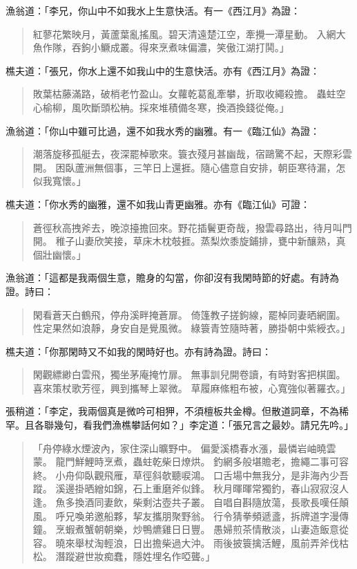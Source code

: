 漁翁道：「李兄，你山中不如我水上生意快活。有一《西江月》為證：
\begin{quote}
紅蓼花繁映月，黃蘆葉亂搖風。碧天清遠楚江空，牽攪一潭星動。
入網大魚作隊，吞鉤小鱖成叢。得來烹煮味偏濃，笑傲江湖打鬨。」
\end{quote}

樵夫道：「張兄，你水上還不如我山中的生意快活。亦有《西江月》為證：
\begin{quote}
敗葉枯藤滿路，破梢老竹盈山。女蘿乾葛亂牽攀，折取收繩殺擔。
蟲蛀空心榆柳，風吹斷頭松柟。採來堆積備冬寒，換酒換錢從俺。」
\end{quote}

漁翁道：「你山中雖可比過，還不如我水秀的幽雅。有一《臨江仙》為證：
\begin{quote}
潮落旋移孤艇去，夜深罷棹歌來。簑衣殘月甚幽哉，宿鷗驚不起，天際彩雲開。
困臥蘆洲無個事，三竿日上還捱。隨心儘意自安排，朝臣寒待漏，怎似我寬懷。」
\end{quote}

樵夫道：「你水秀的幽雅，還不如我山青更幽雅。亦有《臨江仙》可證：
\begin{quote}
蒼徑秋高拽斧去，晚涼擡擔回來。野花插鬢更奇哉，撥雲尋路出，待月叫門開。
稚子山妻欣笑接，草床木枕攲捱。蒸梨炊黍旋鋪排，甕中新釀熟，真個壯幽懷。」
\end{quote}

漁翁道：「這都是我兩個生意，贍身的勾當，你卻沒有我閑時節的好處。有詩為證。詩曰：
\begin{quote}
閑看蒼天白鶴飛，停舟溪畔掩蒼扉。
倚篷教子搓鉤線，罷棹同妻晒網圍。
性定果然如浪靜，身安自是覺風微。
綠簑青笠隨時著，勝掛朝中紫綬衣。」
\end{quote}

樵夫道：「你那閑時又不如我的閑時好也。亦有詩為證。詩曰：
\begin{quote}
閑觀縹緲白雲飛，獨坐茅庵掩竹扉。
無事訓兒開卷讀，有時對客把棋圍。
喜來策杖歌芳徑，興到攜琴上翠微。
草履麻絛粗布被，心寬強似著羅衣。」
\end{quote}

張稍道：「李定，我兩個真是微吟可相狎，不須檀板共金樽。但散道詞章，不為稀罕。且各聯幾句，看我們漁樵攀話何如？」李定道：「張兄言之最妙。請兄先吟。」
\begin{quote}
「舟停綠水煙波內，家住深山曠野中。
偏愛溪橋春水漲，最憐岩岫曉雲蒙。
龍門鮮鯉時烹煮，蟲蛀乾柴日燎烘。
釣網多般堪贍老，擔繩二事可容終。
小舟仰臥觀飛雁，草徑斜欹聽唳鴻。
口舌場中無我分，是非海內少吾蹤。
溪邊掛晒繒如錦，石上重磨斧似鋒。
秋月暉暉常獨釣，春山寂寂沒人逢。
魚多換酒同妻飲，柴剩沽壺共子叢。
自唱自斟隨放蕩，長歌長嘆任顛風。
呼兄喚弟邀船夥，挈友攜朋聚野翁。
行令猜拳頻遞盞，拆牌道字漫傳鐘。
烹蝦煮蟹朝朝樂，炒鴨爊雞日日豐。
愚婦煎茶情散淡，山妻造飯意從容。
曉來舉杖淘輕浪，日出擔柴過大沖。
雨後披簑擒活鯉，風前弄斧伐枯松。
潛蹤避世妝痴蠢，隱姓埋名作啞聾。」
\end{quote}

